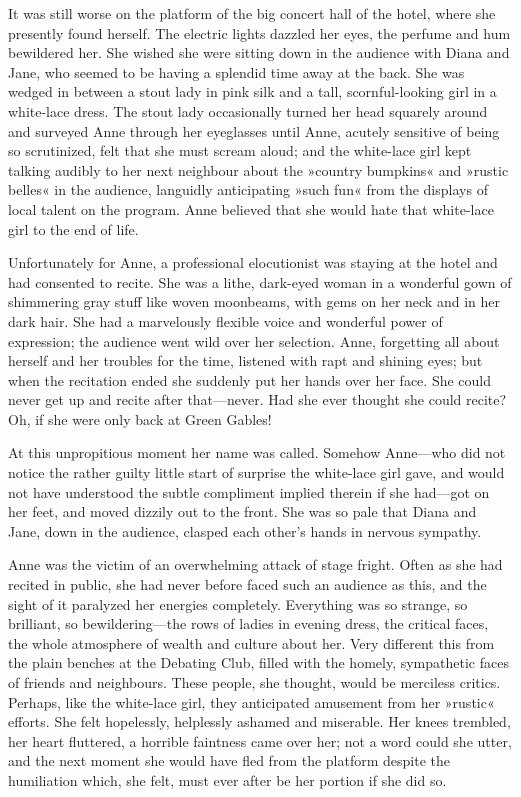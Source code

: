 It was still worse on the platform of the big concert hall of the hotel, where she presently found herself. The electric lights dazzled her eyes, the perfume and hum bewildered her. She wished she were sitting down in the audience with Diana and Jane, who seemed to be having a splendid time away at the back. She was wedged in between a stout lady in pink silk and a tall, scornful-looking girl in a white-lace dress. The stout lady occasionally turned her head squarely around and surveyed Anne through her eyeglasses until Anne, acutely sensitive of being so scrutinized, felt that she must scream aloud; and the white-lace girl kept talking audibly to her next neighbour about the »country bumpkins« and »rustic belles« in the audience, languidly anticipating »such fun« from the displays of local talent on the program. Anne believed that she would hate that white-lace girl to the end of life.

Unfortunately for Anne, a professional elocutionist was staying at the hotel and had consented to recite. She was a lithe, dark-eyed woman in a wonderful gown of shimmering gray stuff like woven moonbeams, with gems on her neck and in her dark hair. She had a marvelously flexible voice and wonderful power of expression; the audience went wild over her selection. Anne, forgetting all about herself and her troubles for the time, listened with rapt and shining eyes; but when the recitation ended she suddenly put her hands over her face. She could never get up and recite after that—never. Had she ever thought she could recite? Oh, if she were only back at Green Gables!

At this unpropitious moment her name was called. Somehow Anne—who did not notice the rather guilty little start of surprise the white-lace girl gave, and would not have understood the subtle compliment implied therein if she had—got on her feet, and moved dizzily out to the front. She was so pale that Diana and Jane, down in the audience, clasped each other's hands in nervous sympathy.

Anne was the victim of an overwhelming attack of stage fright. Often as she had recited in public, she had never before faced such an audience as this, and the sight of it paralyzed her energies completely. Everything was so strange, so brilliant, so bewildering—the rows of ladies in evening dress, the critical faces, the whole atmosphere of wealth and culture about her. Very different this from the plain benches at the Debating Club, filled with the homely, sympathetic faces of friends and neighbours. These people, she thought, would be merciless critics. Perhaps, like the white-lace girl, they anticipated amusement from her »rustic« efforts. She felt hopelessly, helplessly ashamed and miserable. Her knees trembled, her heart fluttered, a horrible faintness came over her; not a word could she utter, and the next moment she would have fled from the platform despite the humiliation which, she felt, must ever after be her portion if she did so.

